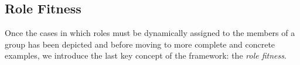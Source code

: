 \subsection{Role Fitness}

Once the cases in which roles must be dynamically assigned to the members of a group has been depicted and before moving to more complete and concrete examples, we introduce the last key concept of the framework: the \textit{role fitness}.

















